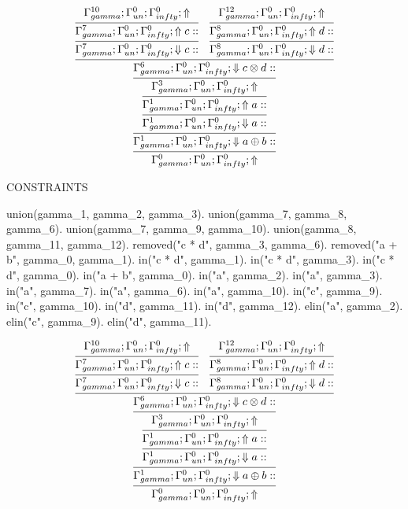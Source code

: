 \documentclass[a4paper, 11pt]{article}
\begin{document}
\[
\infer{\Gamma_{ gamma}^{0} ; \Gamma_{un}^{0} ; \Gamma_{ infty}^{0} ;  \Uparrow }
{\infer{\Gamma_{ gamma}^{1} ; \Gamma_{un}^{0} ; \Gamma_{ infty}^{0} ;  \Downarrow a \oplus b :: }
{\infer{\Gamma_{ gamma}^{1} ; \Gamma_{un}^{0} ; \Gamma_{ infty}^{0} ;  \Downarrow a :: }
{\infer{\Gamma_{ gamma}^{1} ; \Gamma_{un}^{0} ; \Gamma_{ infty}^{0} ;  \Uparrow a :: }
{\infer{\Gamma_{ gamma}^{3} ; \Gamma_{un}^{0} ; \Gamma_{ infty}^{0} ;  \Uparrow }
{\infer{\Gamma_{ gamma}^{6} ; \Gamma_{un}^{0} ; \Gamma_{ infty}^{0} ;  \Downarrow c \otimes d :: }
{\infer{\Gamma_{ gamma}^{7} ; \Gamma_{un}^{0} ; \Gamma_{ infty}^{0} ;  \Downarrow c :: }
{\infer{\Gamma_{ gamma}^{7} ; \Gamma_{un}^{0} ; \Gamma_{ infty}^{0} ;  \Uparrow c :: }
{\Gamma_{ gamma}^{10} ; \Gamma_{un}^{0} ; \Gamma_{ infty}^{0} ;  \Uparrow }}
&
\infer{\Gamma_{ gamma}^{8} ; \Gamma_{un}^{0} ; \Gamma_{ infty}^{0} ;  \Downarrow d :: }
{\infer{\Gamma_{ gamma}^{8} ; \Gamma_{un}^{0} ; \Gamma_{ infty}^{0} ;  \Uparrow d :: }
{\Gamma_{ gamma}^{12} ; \Gamma_{un}^{0} ; \Gamma_{ infty}^{0} ;  \Uparrow }}}}}}}}
\]
 
CONSTRAINTS 

union(gamma\_1, gamma\_2, gamma\_3).
union(gamma\_7, gamma\_8, gamma\_6).
union(gamma\_7, gamma\_9, gamma\_10).
union(gamma\_8, gamma\_11, gamma\_12).
removed("c * d", gamma\_3, gamma\_6).
removed("a + b", gamma\_0, gamma\_1).
in("c * d", gamma\_1).
in("c * d", gamma\_3).
in("c * d", gamma\_0).
in("a + b", gamma\_0).
in("a", gamma\_2).
in("a", gamma\_3).
in("a", gamma\_7).
in("a", gamma\_6).
in("a", gamma\_10).
in("c", gamma\_9).
in("c", gamma\_10).
in("d", gamma\_11).
in("d", gamma\_12).
elin("a", gamma\_2).
elin("c", gamma\_9).
elin("d", gamma\_11).

\[
\infer{\Gamma_{ gamma}^{0} ; \Gamma_{un}^{0} ; \Gamma_{ infty}^{0} ;  \Uparrow }
{\infer{\Gamma_{ gamma}^{1} ; \Gamma_{un}^{0} ; \Gamma_{ infty}^{0} ;  \Downarrow a \oplus b :: }
{\infer{\Gamma_{ gamma}^{1} ; \Gamma_{un}^{0} ; \Gamma_{ infty}^{0} ;  \Downarrow a :: }
{\infer{\Gamma_{ gamma}^{1} ; \Gamma_{un}^{0} ; \Gamma_{ infty}^{0} ;  \Uparrow a :: }
{\infer{\Gamma_{ gamma}^{3} ; \Gamma_{un}^{0} ; \Gamma_{ infty}^{0} ;  \Uparrow }
{\infer{\Gamma_{ gamma}^{6} ; \Gamma_{un}^{0} ; \Gamma_{ infty}^{0} ;  \Downarrow c \otimes d :: }
{\infer{\Gamma_{ gamma}^{7} ; \Gamma_{un}^{0} ; \Gamma_{ infty}^{0} ;  \Downarrow c :: }
{\infer{\Gamma_{ gamma}^{7} ; \Gamma_{un}^{0} ; \Gamma_{ infty}^{0} ;  \Uparrow c :: }
{\Gamma_{ gamma}^{10} ; \Gamma_{un}^{0} ; \Gamma_{ infty}^{0} ;  \Uparrow }}
&
\infer{\Gamma_{ gamma}^{8} ; \Gamma_{un}^{0} ; \Gamma_{ infty}^{0} ;  \Downarrow d :: }
{\infer{\Gamma_{ gamma}^{8} ; \Gamma_{un}^{0} ; \Gamma_{ infty}^{0} ;  \Uparrow d :: }
{\Gamma_{ gamma}^{12} ; \Gamma_{un}^{0} ; \Gamma_{ infty}^{0} ;  \Uparrow }}}}}}}}
\]
\end{document}
